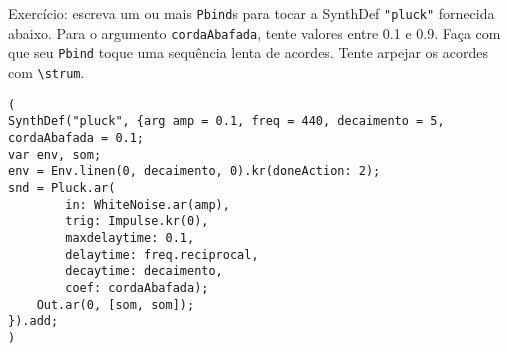 Exercício: escreva um ou mais \texttt{Pbind}s para tocar a SynthDef \texttt{"pluck"} fornecida abaixo. Para o argumento \texttt{cordaAbafada}, tente valores entre  0.1 e 0.9. Faça com que seu \texttt{Pbind} toque uma sequência lenta de acordes. Tente arpejar os acordes com \texttt{\textbackslash strum}.

\begin{lstlisting}[style=SuperCollider-IDE, basicstyle=\scttfamily\footnotesize]
(
SynthDef("pluck", {arg amp = 0.1, freq = 440, decaimento = 5, cordaAbafada = 0.1;
var env, som;
env = Env.linen(0, decaimento, 0).kr(doneAction: 2);
snd = Pluck.ar(
        in: WhiteNoise.ar(amp),
        trig: Impulse.kr(0),
        maxdelaytime: 0.1,
        delaytime: freq.reciprocal,
        decaytime: decaimento,
        coef: cordaAbafada);
    Out.ar(0, [som, som]);
}).add;
)
\end{lstlisting}
